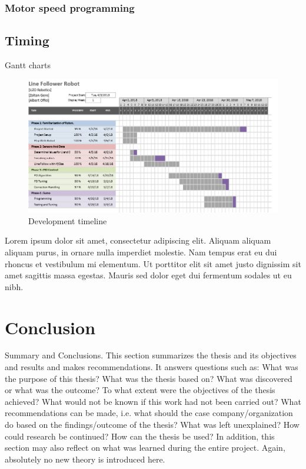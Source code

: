 \documentclass[11pt,a4paper,oneside,article]{memoir}
\begin{document}
\subsection{Motor speed programming}

\section{Timing}
Gantt charts

\begin{figure}[h]
	\centering
	\includegraphics[width=15cm]{illustration/development_timeline}
	\caption{Development timeline}
	\label{fig:dev_timeline}
\end{figure}

Lorem ipsum dolor sit amet, consectetur adipiscing elit. Aliquam aliquam aliquam purus, in ornare nulla imperdiet molestie. Nam tempus erat eu dui rhoncus et vestibulum mi elementum. Ut porttitor elit sit amet justo dignissim sit amet sagittis massa egestas. Mauris sed dolor eget dui fermentum sodales ut eu nibh. 


\chapter{Conclusion}

Summary and Conclusions. This section summarizes the thesis and its
objectives and results and makes recommendations. It answers
questions such as: What was the purpose of this thesis? What was the
thesis based on? What was discovered or what was the outcome? To
what extent were the objectives of the thesis achieved? What would not
be known if this work had not been carried out? What recommendations
can be made, i.e. what should the case company/organization do based
on the findings/outcome of the thesis? What was left unexplained? How
could research be continued? How can the thesis be used? In addition,
this section may also reflect on what was learned during the entire
project. Again, absolutely no new theory is introduced here.
\end{document}
